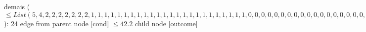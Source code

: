 {{{{%
demais ($\leq List(5, 4, 2, 2, 2, 2, 2, 2, 2, 1, 1, 1, 1, 1, 1, 1, 1, 1, 1, 1, 1, 1, 1, 1, 1, 1, 1, 1, 1, 1, 1, 1, 1, 0, 0, 0, 0, 0, 0, 0, 0, 0, 0, 0, 0, 0, 0, 0, 0, 0, 0, 0, 0, 0, 0, 0, 0, 0, 0, 0, 0, 0, 0, 0, 0, 0, 0, 0, 0, 0, 0, 0, 0, 0, 0)$): 24} edge from parent node [cond] {$\leq42.2$}}
child {node [outcome] {
}}}}
